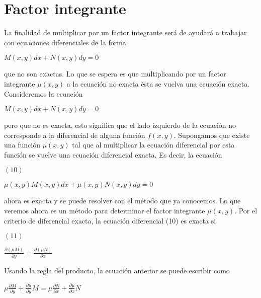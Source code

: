 \documentclass[l etterpaper,11pt]{article}
\begin{document}
{\section{Factor integrante }}

La finalidad de multiplicar por un factor integrante será de ayudará a trabajar con ecuaciones diferenciales de la forma
\begin{center}

$M(x,y)dx+N(x,y)dy=0$\\
\end{center}

que no son exactas. Lo que se espera es que multiplicando por un factor integrante $ \mu(x,y) $  a la ecuación no exacta ésta se vuelva una ecuación exacta.
Consideremos la ecuación
\begin{center}

$M(x,y)dx+N(x,y)dy=0$\\
\end{center}

pero que no es exacta, esto significa que el lado izquierdo de la ecuación no corresponde a la diferencial de alguna función $ f(x,y). $ Supongamos que existe una función $ \mu(x,y) $ tal que al multiplicar la ecuación diferencial por esta función se vuelve una ecuación diferencial exacta. Es decir, la ecuación
\begin{flushleft} 
$(10)$
\end{flushleft}

\begin{center}

$\mu(x,y)M(x,y)dx+\mu(x,y)N(x,y)dy=0$\\
\end{center}

ahora es exacta y se puede resolver con el método que ya conocemos. Lo que veremos ahora es un método para determinar el factor integrante $ \mu(x,y). $
Por el criterio de diferencial exacta, la ecuación diferencial (10) es exacta si
\begin{flushleft} 
$(11)$
\end{flushleft}

\begin{center}

$\frac{\partial(\mu M)}{\partial y}=\frac{\partial(\mu N)}{\partial x}$\\
\end{center}

Usando la regla del producto, la ecuación anterior se puede escribir como
\begin{center}

$\mu\frac{\partial M}{\partial y}+\frac{\partial\mu}{\partial y}M=\mu\frac{\partial N}{\partial x}+\frac{\partial\mu}{\partial x}N$\\
\end{center}
\end{document}
